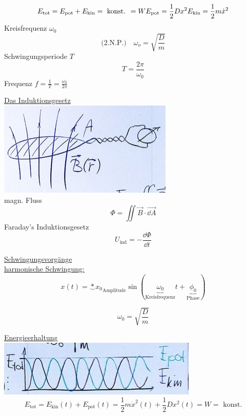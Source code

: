 \[
	E_{\text{tot}} = E_{\text{pot}} + E_{\text{kin}} = \text{ konst. } = W \\
	E_{\text{pot}} = \frac{1}{2} D x^2 \\
	E_{\text{kin}} = \frac{1}{2} m \dot{x}^2
\]
Kreisfrequenz $\omega_0$
\[ \text{(2.N.P.)} \quad \omega_o = \sqrt{\frac{D}{m}} \]
Schwingungsperiode $T$
\[ \boxed{ T = \frac{2\pi}{\omega_0} } \]
Frequenz $f = \frac{1}{T} = \frac{\omega_0}{2\pi}$

\begin{rep*}
	\uline{Das Induktionsgesetz} \\
	\includegraphics{Bild214} \\
	magn. Fluss
	\[ \Phi = \iint \vec{B} \cdot \vec{\dd A} \]
	Faraday's Induktionsgesetz
	\[ \boxed{ U_{\text{ind}} = -\frac{\dd \Phi}{\dd t} } \]
	
	\uline{Schwingungsvorgänge} \\
	\uline{harmonische Schwingung:}
	\[ \boxed{ x(t) = \underbrace*{x_0}_{\text{Amplitude}} \sin( \underbrace{\omega_0}_{\text{Kreisfrequenz}} t + \underbrace{\phi_0}_{\text{Phase}} ) } \]
	\begin{bsp*}[ note = Federpendel ]
		\[ \omega_0 = \sqrt{\frac{D}{m}} \]
	\end{bsp*}
	\uline{Energieerhaltung} \\
	\includegraphics{Bild215}
	\[ E_{\text{tot}} = E_{\text{kin}}(t) + E_{\text{pot}}(t) = \frac{1}{2} m \dot{x}^2(t) + \frac{1}{2} D x^2(t) = W = \text{ konst.} \]
\end{rep*}

